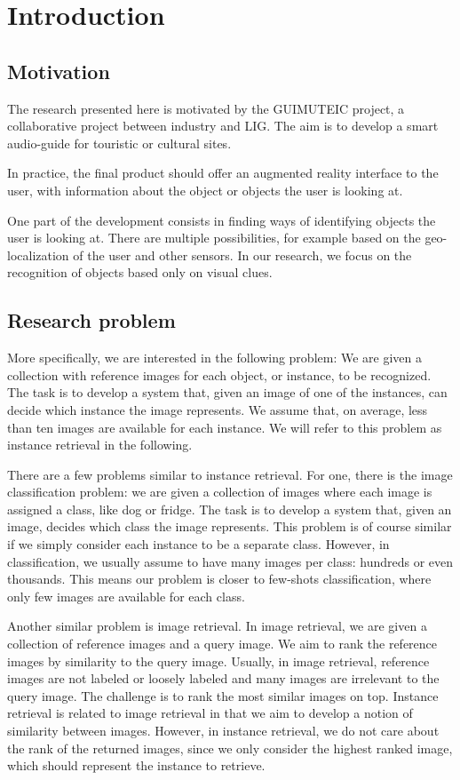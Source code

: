 
\chapter{Introduction}
\section{Motivation}
The research presented here is motivated by the GUIMUTEIC project,
a collaborative project between industry and LIG. The
aim is to develop a smart audio-guide for touristic or cultural sites.

In practice, the final product should offer an augmented reality
interface to the user, with information about the object or objects
the user is looking at.

One part of the development consists in finding ways of identifying
objects the user is looking at. There are multiple possibilities,
for example based on the geo-localization of the user and other sensors.
In our research, we focus on the recognition of objects based
only on visual clues.

\section{Research problem}
More specifically, we are interested in the following problem:
We are given a collection with reference images for each object,
or instance, to be recognized. The task is to develop a system that,
given an image of one of the instances, can decide which instance
the image represents. We assume that, on average, less than ten images
are available for each instance.
We will refer to this problem as instance retrieval in the following.

There are a few problems similar to instance retrieval. For one, there is
the image classification problem: we are given a collection of images
where each image is assigned a class, like dog or fridge.
The task is to develop a system that, given an image, decides which
class the image represents.
This problem is of course similar if we simply consider each instance
to be a separate class. However, in classification, we usually
assume to have many images per class: hundreds or even thousands.
This means our problem is closer to few-shots classification, where
only few images are available for each class.

Another similar problem is image retrieval. In image retrieval,
we are given a collection of reference images and a query image.
We aim to rank the reference images by similarity to the query image.
Usually, in image retrieval, reference images are not labeled or loosely
labeled and many images are irrelevant to the query image. The challenge
is to rank the most similar images on top.
Instance retrieval is related to image retrieval in that we aim to
develop a notion of similarity between images. However, in instance
retrieval, we do not care about the rank of the returned images, since
we only consider the highest ranked image, which should represent the
instance to retrieve.

